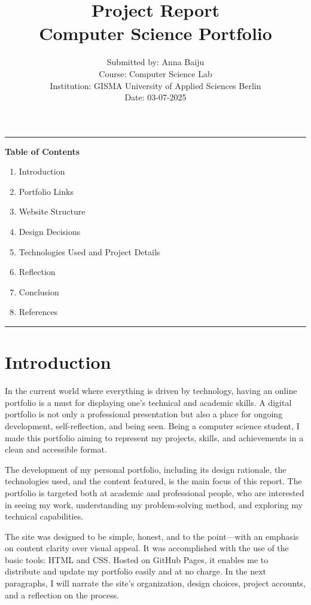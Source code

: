 \documentclass[12pt,a4paper]{article}
\title{\textbf{Project Report \\[0.5em] Computer Science Portfolio}}
\author{Submitted by: Anna Baiju \\[0.5em]
Course: Computer Science Lab \\ 
Institution: GISMA University of Applied Sciences Berlin \\[0.5em]
Date: 03-07-2025}
\date{}
\begin{document}
\maketitle
\hrule
\vspace{1em}

\noindent\textbf{Table of Contents}

\begin{enumerate}
    \item Introduction
    \item Portfolio Links
    \item Website Structure
    \item Design Decisions
    \item Technologies Used and Project Details
    \item Reflection
    \item Conclusion
    \item References
\end{enumerate}

\vspace{1em}
\hrule
\vspace{2em}

\section{Introduction}
In the current world where everything is driven by technology, having an online portfolio is a must for displaying one's technical and academic skills. A digital portfolio is not only a professional presentation but also a place for ongoing development, self-reflection, and being seen. Being a computer science student, I made this portfolio aiming to represent my projects, skills, and achievements in a clean and accessible format.

The development of my personal portfolio, including its design rationale, the technologies used, and the content featured, is the main focus of this report. The portfolio is targeted both at academic and professional people, who are interested in seeing my work, understanding my problem-solving method, and exploring my technical capabilities.

The site was designed to be simple, honest, and to the point—with an emphasis on content clarity over visual appeal. It was accomplished with the use of the basic tools: HTML and CSS. Hosted on GitHub Pages, it enables me to distribute and update my portfolio easily and at no charge. In the next paragraphs, I will narrate the site’s organization, design choices, project accounts, and a reflection on the process.
\end{document}
